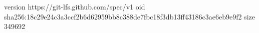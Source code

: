 version https://git-lfs.github.com/spec/v1
oid sha256:18c29e24c3a3ccf2b6d62959bb8c388de7fbc18f3db13ff43186c3ae6eb9e9f2
size 349692
